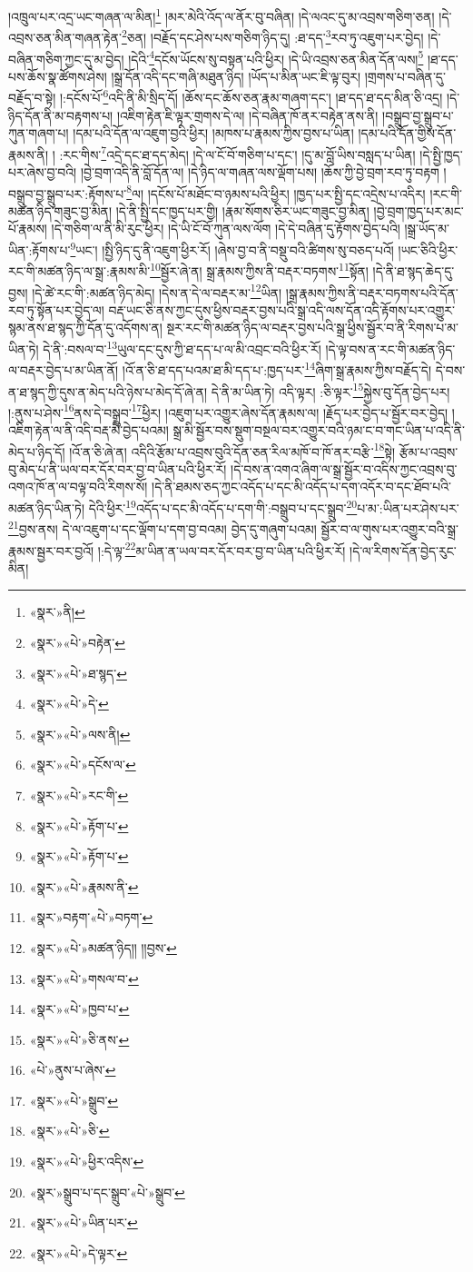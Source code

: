 །འཁྲུལ་པར་འདྲ་ཡང་གཞན་ལ་མིན།\footnote{«སྣར་»ནི།} །མར་མེའི་འོད་ལ་ནོར་བུ་བཞིན། །དེ་ལའང་དུ་མ་འབྲས་གཅིག་ཅན། །དེ་འབྲས་ཅན་མིན་གཞན་རྟེན་\footnote{«སྣར་»«པེ་»བརྟེན་}ཅན། །བརྗོད་དང་ཤེས་པས་གཅིག་ཉིད་དུ། :ཐ་དད་\footnote{«སྣར་»«པེ་»ཐ་སྙད་}རབ་ཏུ་འཇུག་པར་བྱེད། །དེ་བཞིན་གཅིག་ཀྱང་དུ་མ་བྱེད། །དེའི་\footnote{«སྣར་»«པེ་»དེ་}དངོས་ཡོངས་སུ་བསྟན་པའི་ཕྱིར། །དེ་ཡི་འབྲས་ཅན་མིན་དོན་ལས།\footnote{«སྣར་»«པེ་»ལས་ནི།} །ཐ་དད་པས་ཆོས་སྣ་ཚོགས་ཤེས། །སྒྲ་དོན་འདི་དང་གཞི་མཐུན་ཉིད། །ཡོད་པ་མིན་ཡང་ཇི་ལྟ་བུར། །གྲགས་པ་བཞིན་དུ་བརྗོད་བ་སྟེ། །:དངོས་པོ་\footnote{«སྣར་»«པེ་»དངོས་ལ་}འདི་ནི་མི་སྲིད་དོ། །ཆོས་དང་ཆོས་ཅན་རྣམ་གཞག་དང་། །ཐ་དད་ཐ་དད་མིན་ཅི་འདྲ། །དེ་ཉིད་དོན་ནི་མ་བརྟགས་པ། །འཇིག་རྟེན་ཇི་ལྟར་གྲགས་དེ་ལ། །དེ་བཞིན་ཁོ་ནར་བརྟེན་ནས་ནི། །བསྒྲུབ་བྱ་སྒྲུབ་པ་ཀུན་གཞག་པ། །དམ་པའི་དོན་ལ་འཇུག་བྱའི་ཕྱིར། །མཁས་པ་རྣམས་ཀྱིས་བྱས་པ་ཡིན། །དམ་པའི་དོན་གྱིས་དོན་རྣམས་ནི། །
:རང་གིས་\footnote{«སྣར་»«པེ་»རང་གི་}འདྲེ་དང་ཐ་དད་མེད། །དེ་ལ་ངོ་བོ་གཅིག་པ་དང་། །དུ་མ་བློ་ཡིས་བསླད་པ་ཡིན། །དེ་སྤྱི་ཁྱད་པར་ཞེས་བྱ་བའི། །བྱེ་བྲག་འདི་ནི་བློ་དོན་ལ། །དེ་ཉིད་ལ་གཞན་ལས་ལྡོག་པས། །ཆོས་ཀྱི་བྱེ་བྲག་རབ་ཏུ་བརྟག །བསྒྲུབ་བྱ་སྒྲུབ་པར་:རྟོགས་པ་\footnote{«སྣར་»«པེ་»རྟོག་པ་}ལ། །དངོས་པོ་མཐོང་བ་ཉམས་པའི་ཕྱིར། །ཁྱད་པར་སྤྱི་དང་འདྲེས་པ་འདིར། །རང་གི་མཚན་ཉིད་གཟུང་བྱ་མིན། །དེ་ནི་སྤྱི་དང་ཁྱད་པར་གྱི། །རྣམ་སོགས་ཅིར་ཡང་གཟུང་བྱ་མིན། །བྱེ་བྲག་ཁྱད་པར་མང་པོ་རྣམས། །དེ་གཅིག་ལ་ནི་མི་རུང་ཕྱིར། །དེ་ཡི་ངོ་བོ་ཀུན་ལས་ལོག །དེ་དེ་བཞིན་དུ་རྟོགས་བྱེད་པའི། །སྒྲ་ཡོད་མ་ཡིན་:རྟོགས་པ་\footnote{«སྣར་»«པེ་»རྟོག་པ་}ཡང་། །སྤྱི་ཉིད་དུ་ནི་འཇུག་ཕྱིར་རོ། །ཞེས་བྱ་བ་ནི་བསྡུ་བའི་ཚིགས་སུ་བཅད་པའོ། །ཡང་ཅིའི་ཕྱིར་རང་གི་མཚན་ཉིད་ལ་སྒྲ་:རྣམས་མི་\footnote{«སྣར་»«པེ་»རྣམས་ནི་}སྦྱོར་ཞེ་ན། སྒྲ་རྣམས་ཀྱིས་ནི་བརྡར་བཏགས་\footnote{«སྣར་»བརྟག་«པེ་»བཏག་}སྟོན། །དེ་ནི་ཐ་སྙད་ཆེད་དུ་བྱས། །དེ་ཚེ་རང་གི་:མཚན་ཉིད་མེད། །དེས་ན་དེ་ལ་བརྡར་མ་\footnote{«སྣར་»«པེ་»མཚན་ཉིད།། །།བྱས་}ཡིན། །སྒྲ་རྣམས་ཀྱིས་ནི་བརྡར་བཏགས་པའི་དོན་རབ་ཏུ་སྟོན་པར་བྱེད་ལ། བརྡ་ཡང་ཅི་ནས་ཀྱང་དུས་ཕྱིས་བརྡར་བྱས་པའི་སྒྲ་འདི་ལས་དོན་འདི་རྟོགས་པར་འགྱུར་སྙམ་ནས་ཐ་སྙད་ཀྱི་དོན་དུ་འདོགས་ན། སྔར་རང་གི་མཚན་ཉིད་ལ་བརྡར་བྱས་པའི་སྒྲ་ཕྱིས་སྦྱོར་བ་ནི་རིགས་པ་མ་ཡིན་ཏེ། དེ་ནི་:བསལ་བ་\footnote{«སྣར་»«པེ་»གསལ་བ་}ཡུལ་དང་དུས་ཀྱི་ཐ་དད་པ་ལ་མི་འབྲང་བའི་ཕྱིར་རོ། །དེ་ལྟ་བས་ན་རང་གི་མཚན་ཉིད་ལ་བརྡར་བྱེད་པ་མ་ཡིན་ནོ། །འོ་ན་ཅི་ཐ་དད་པའམ་ཐ་མི་དད་པ་:ཁྱད་པར་\footnote{«སྣར་»«པེ་»ཁྱབ་པ་}ཞིག་སྒྲ་རྣམས་ཀྱིས་བརྗོད་དེ། དེ་བས་ན་ཐ་སྙད་ཀྱི་དུས་ན་མེད་པའི་ཉེས་པ་མེད་དོ་ཞེ་ན། དེ་ནི་མ་ཡིན་ཏེ། འདི་ལྟར། :ཅི་ལྟར་\footnote{«སྣར་»«པེ་»ཅི་ནས་}སྐྱེས་བུ་དོན་བྱེད་པར། །:ནུས་པ་ཤེས་\footnote{«པེ་»ནུས་པ་ཞེས་}ནས་དེ་བསྒྲུབ་\footnote{«སྣར་»«པེ་»སྒྲུབ་}ཕྱིར། །འཇུག་པར་འགྱུར་ཞེས་དོན་རྣམས་ལ། །རྗོད་པར་བྱེད་པ་སྦྱོར་བར་བྱེད། །འཇིག་རྟེན་ལ་ནི་འདི་བརྡ་མི་བྱེད་པའམ། སྒྲ་མི་སྦྱོར་བས་སྡུག་བསྔལ་བར་འགྱུར་བའི་ཉམ་ང་བ་གང་ཡིན་པ་འདི་ནི་མེད་པ་ཉིད་དོ། །འོ་ན་ཅི་ཞེ་ན། འདིའི་རྩོམ་པ་འབྲས་བུའི་དོན་ཅན་རིལ་མཁོ་བ་ཁོ་ནར་བརྩི་\footnote{«སྣར་»«པེ་»ཅི་}སྟེ། རྩོམ་པ་འབྲས་བུ་མེད་པ་ནི་ཡལ་བར་དོར་བར་བྱ་བ་ཡིན་པའི་ཕྱིར་རོ། །དེ་བས་ན་འགའ་ཞིག་ལ་སྒྲ་སྦྱོར་བ་འདིས་ཀྱང་འབྲས་བུ་འགའ་ཁོ་ན་ལ་བལྟ་བའི་རིགས་སོ། །དེ་ནི་ཐམས་ཅད་ཀྱང་འདོད་པ་དང་མི་འདོད་པ་དག་འདོར་བ་དང་ཐོབ་པའི་མཚན་ཉིད་ཡིན་ཏེ། དེའི་ཕྱིར་\footnote{«སྣར་»«པེ་»ཕྱིར་འདིས་}འདོད་པ་དང་མི་འདོད་པ་དག་གི་:བསྒྲུབ་པ་དང་སྒྲུབ་\footnote{«སྣར་»སྒྲུབ་པ་དང་སྒྲུབ་«པེ་»སྒྲུབ་}པ་མ་:ཡིན་པར་ཤེས་པར་\footnote{«སྣར་»«པེ་»ཡིན་པར་}བྱས་ནས། དེ་ལ་འཇུག་པ་དང་ལྡོག་པ་དག་བྱ་བའམ། བྱེད་དུ་གཞུག་པའམ། སྦྱོར་བ་ལ་གུས་པར་འགྱུར་བའི་སྒྲ་རྣམས་སྦྱར་བར་བྱའོ། །:དེ་ལྟ་\footnote{«སྣར་»«པེ་»དེ་ལྟར་}མ་ཡིན་ན་ཡལ་བར་དོར་བར་བྱ་བ་ཡིན་པའི་ཕྱིར་རོ། །དེ་ལ་རིགས་དོན་བྱེད་རུང་མིན། 